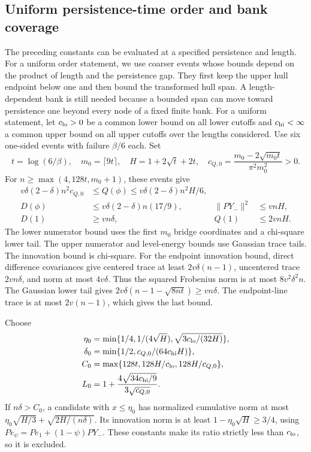 \subsection{Uniform persistence-time order and bank coverage}\label{src16:si-uniform}
The preceding constants can be evaluated at a specified persistence and length. For a uniform order statement, we use coarser events whose bounds depend on the product of length and the persistence gap. They first keep the upper hull endpoint below one and then bound the transformed hull span. A length-dependent bank is still needed because a bounded span can move toward persistence one beyond every node of a fixed finite bank.
For a uniform statement, let $c_{\rm lo}>0$ be a common lower bound on all lower cutoffs and $c_{\rm hi}<\infty$ a common upper bound on all upper cutoffs over the lengths considered. Use six one-sided events with failure $\beta/6$ each. Set
\[
 t=\log(6/\beta),\quad m_0=\lceil9t\rceil,\quad
 H=1+2\sqrt t+2t,\quad
 c_{Q,0}=\frac{m_0-2\sqrt{m_0t}}{\pi^2m_0^2}>0.
\]
For $n\ge\max(4,128t,m_0+1)$, these events give
\begin{align*}
 v\delta(2-\delta)n^2c_{Q,0}&\le Q(\phi)
                  \le v\delta(2-\delta)n^2H/6,\\
 D(\phi)&\le v\delta(2-\delta)n(17/9),&
 \|PY_-\|^2&\le vnH,\\
 D(1)&\ge vn\delta,& Q(1)&\le2vnH.
\end{align*}
The lower numerator bound uses the first $m_0$ bridge coordinates and a chi-square lower tail. The upper numerator and level-energy bounds use Gaussian trace tails. The innovation bound is chi-square. For the endpoint innovation bound, direct difference covariances give centered trace at least $2v\delta(n-1)$, uncentered trace $2vn\delta$, and norm at most $4v\delta$. Thus the squared Frobenius norm is at most $8v^2\delta^2n$. The Gaussian lower tail gives $2v\delta(n-1-\sqrt{8nt})\ge vn\delta$. The endpoint-line trace is at most $2v(n-1)$, which gives the last bound.

Choose
\begin{align}\label{src16:si-uniform-constants}
 \eta_0&=\min\{1/4,1/(4\sqrt H),\sqrt{3c_{\rm lo}/(32H)}\},\notag\\
 \delta_0&=\min\{1/2,c_{Q,0}/(64c_{\rm hi}H)\},\notag\\
 C_0&=\max\{128t,128H/c_{\rm lo},128H/c_{Q,0}\},\notag\\
 L_0&=1+\frac{4\sqrt{34c_{\rm hi}/9}}{3\sqrt{c_{Q,0}}}.
\end{align}
If $n\delta>C_0$, a candidate with $x\le\eta_0$ has normalized cumulative norm at most $\eta_0\sqrt{H/3}+\sqrt{2H/(n\delta)}$. Its innovation norm is at least $1-\eta_0\sqrt H\ge3/4$, using $Pe_\psi=Pe_1+(1-\psi)PY_-$. These constants make its ratio strictly less than $c_{\rm lo}$, so it is excluded.

